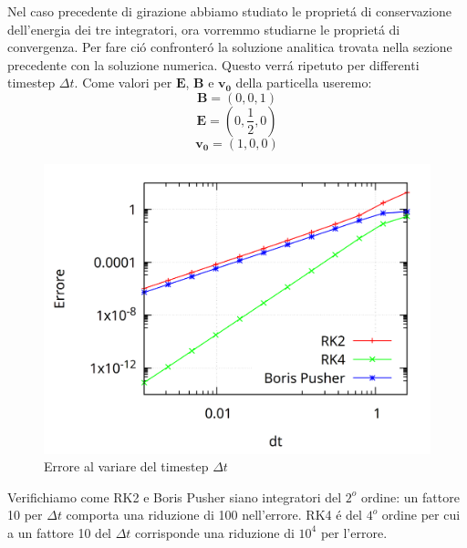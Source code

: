 \documentclass[11pt]{article}
\begin{document}
Nel caso precedente di girazione abbiamo studiato le proprietá di conservazione dell'energia dei tre integratori, ora vorremmo studiarne le proprietá di convergenza.
Per fare ció confronteró la soluzione analitica trovata nella sezione precedente con la soluzione numerica. Questo verrá ripetuto per differenti timestep $\Delta t$.
Come valori per $\mathbf{E}$, $\mathbf{B}$ e $\mathbf{v_0}$ della particella useremo:
\begin{equation}\mathbf{B}=(0,0,1) \end{equation}
\begin{equation}\mathbf{E}=(0,\frac{1}{2},0) \end{equation}
\begin{equation}\mathbf{v_0} = (1,0,0)\end{equation}
\begin{figure}[ht]
  \includegraphics[width=.9\linewidth]{img/convergenza.png}  
  \caption{Errore al variare del timestep $\Delta t$}
\end{figure}%

Verifichiamo come RK2 e Boris Pusher siano integratori del $2^o$ ordine: un fattore 10 per $\Delta t$ comporta una riduzione di 100 nell'errore. RK4 é del $4^o$ ordine per cui a un fattore 10 del $\Delta t$ corrisponde una riduzione di $10^4$ per l'errore.

\newpage
\end{document}
